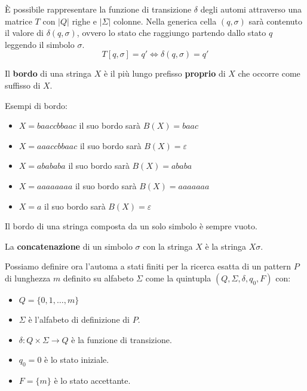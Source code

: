 È possibile rappresentare la funzione di transizione $\delta$ degli automi
attraverso una matrice $T$ con $|Q|$ righe e $|\Sigma|$ colonne. Nella generica
cella $(q, \sigma)$ sarà contenuto il valore di $\delta(q, \sigma)$, ovvero lo
stato che raggiungo partendo dallo stato $q$ leggendo il simbolo $\sigma$.
\begin{equation}
    T[q,\sigma] = q' \iff \delta(q,\sigma) = q'
\end{equation}
\begin{definizione} \label{def:bordo}
    Il \textbf{bordo} di una stringa $X$ è il più lungo prefisso \textbf{proprio}
    di $X$ che occorre come suffisso di $X$.
\end{definizione}
\begin{esempio}
    Esempi di bordo:
    \begin{itemize}
        \item $X = baaccbbaac$ il suo bordo sarà $B(X) = baac$
        \item $X = aaaccbbaac$ il suo bordo sarà $B(X) = \varepsilon$
        \item $X = abababa$ il suo bordo sarà $B(X) = ababa$
        \item $X = aaaaaaaa$ il suo bordo sarà $B(X) = aaaaaaa$
        \item $X = a$ il suo bordo sarà $B(X) = \varepsilon$
    \end{itemize}
\end{esempio}
\begin{nota}
    Il bordo di una stringa composta da un solo simbolo è sempre vuoto.
\end{nota}
\begin{definizione}
    La \textbf{concatenazione} di un simbolo $\sigma$ con la stringa $X$ è la
    stringa $X\sigma$.
\end{definizione}
Possiamo definire ora l'automa a stati finiti per la ricerca esatta di un pattern
$P$ di lunghezza $m$ definito su alfabeto $\Sigma$ come la quintupla $(Q, \Sigma,
    \delta, q_0, F)$ con:
\begin{itemize}
    \item $Q = \{0, 1, \dots, m\}$
    \item $\Sigma$ è l'alfabeto di definizione di $P$.
    \item $\delta: Q \times \Sigma \to Q$ è la funzione di transizione.
    \item $q_0 = 0$ è lo stato iniziale.
    \item $F = \{m\}$ è lo stato accettante.
\end{itemize}
